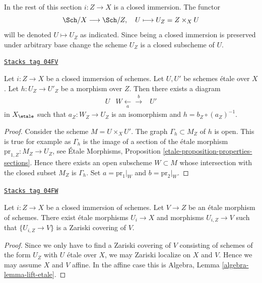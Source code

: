 \medskip\noindent
In the rest of this section $i : Z \to X$ is a closed immersion.
The functor
$$
\Sch/X \longrightarrow \Sch/Z, \quad
U \longmapsto U_Z = Z \times_X U
$$
will be denoted $U \mapsto U_Z$ as indicated. Since being a closed immersion
is preserved under arbitrary base change the scheme $U_Z$ is a closed subscheme
of $U$.

\begin{lemma}
\label{etale-cohomology-lemma-closed-immersion-almost-full}
\href{https://stacks.math.columbia.edu/tag/04FV}{\texttt{Stacks tag 04FV}}

Let $i : Z \to X$ be a closed immersion of schemes.
Let $U, U'$ be schemes \'etale over $X$. Let $h : U_Z \to U'_Z$
be a morphism over $Z$. Then there exists a diagram
$$
\begin{array}{ccc}U & W \underset{a}{\longleftarrow}\overset{b}{\longrightarrow} & U'\end{array}
$$
in $X_\etale$ such that $a_Z : W_Z \to U_Z$
is an isomorphism and $h = b_Z \circ (a_Z)^{-1}$.
\end{lemma}

\begin{proof}
Consider the scheme $M = U \times_X U'$. The graph $\Gamma_h \subset M_Z$
of $h$ is open. This is true for example as $\Gamma_h$ is the image of a
section of the \'etale morphism $\text{pr}_{1, Z} : M_Z \to U_Z$, see
\'Etale Morphisms, Proposition \ref{etale-proposition-properties-sections}.
Hence there exists an open subscheme $W \subset M$ whose intersection with
the closed subset $M_Z$ is $\Gamma_h$. Set $a = \text{pr}_1|_W$
and $b = \text{pr}_2|_W$.
\end{proof}

\begin{lemma}
\label{etale-cohomology-lemma-closed-immersion-almost-essentially-surjective}
\href{https://stacks.math.columbia.edu/tag/04FW}{\texttt{Stacks tag 04FW}}

Let $i : Z \to X$ be a closed immersion of schemes.
Let $V \to Z$ be an \'etale morphism of schemes.
There exist \'etale morphisms $U_i \to X$ and morphisms
$U_{i, Z} \to V$ such that $\{U_{i, Z} \to V\}$
is a Zariski covering of $V$.
\end{lemma}

\begin{proof}
Since we only have to find a Zariski covering of $V$ consisting of schemes
of the form $U_Z$ with $U$ \'etale over $X$, we may Zariski localize on $X$
and $V$. Hence we may assume $X$ and $V$ affine. In the affine case this is
Algebra, Lemma \ref{algebra-lemma-lift-etale}.
\end{proof}

